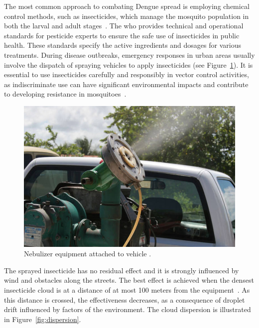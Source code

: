 The most common approach to combating Dengue spread is employing chemical
control methods, such as insecticides, which manage the mosquito population in
both the larval and adult stages~\citep{brasil-dept-helth:2009}. The \gls{who}
provides technical and operational standards for pesticide experts to ensure the
safe use of insecticides in public health. These standards specify the active
ingredients and dosages for various treatments. During disease outbreaks,
emergency responses in urban areas usually involve the dispatch of spraying
vehicles to apply insecticides (see Figure~\ref{fig:nebulizer}). It is essential
to use insecticides carefully and responsibly in vector control activities, as
indiscriminate use can have significant environmental impacts and contribute to
developing resistance in mosquitoes~\citep{WHO2009,WHO2020}.

\begin{figure}[h!]
	\centering
	\includegraphics[scale=0.5]{images/fumace.jpg}
	\caption{Nebulizer equipment attached to vehicle \citep{fumace-2022}.}
	\label{fig:nebulizer}
\end{figure}

The sprayed insecticide has no residual  effect and it is strongly influenced by
wind  and obstacles  along the  streets. The  best effect  is achieved  when the
densest  insecticide cloud  is at  a distance  of at  most 100  meters from  the
equipment~\citep{brasil-dept-helth:2009}.  As this  distance  is  crossed, the
effectiveness  decreases, as a consequence of droplet drift influenced by
factors of the environment. The cloud dispersion is illustrated in
Figure~\ref{fig:dispersion}.

